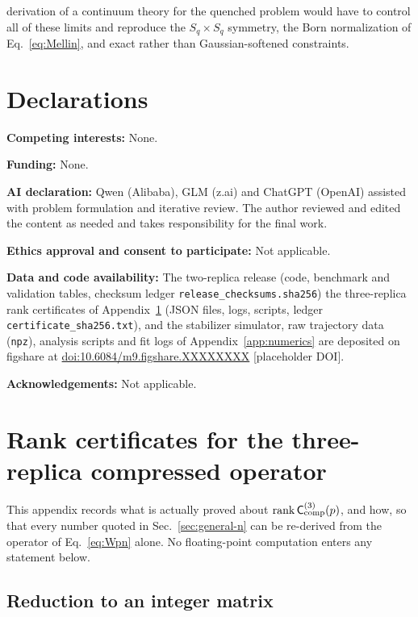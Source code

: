\documentclass[aps,prx,reprint,superscriptaddress,nobibnotes,longbibliography]{revtex4-2}
\theoremstyle{remark}
\newcommand{\rk}{\operatorname{rank}}
\newcommand{\Ccomp}{\mathsf C_{\rm comp}}
\begin{document}
derivation of a continuum theory for the quenched problem would have to control all of these limits and reproduce the $S_q\times S_q$ symmetry, the Born normalization of Eq.~\eqref{eq:Mellin}, and exact rather than Gaussian-softened constraints.


\section*{Declarations}

\noindent\textbf{Competing interests:} None.

\noindent\textbf{Funding:} None.

\noindent\textbf{AI declaration:} Qwen (Alibaba), GLM (z.ai) and ChatGPT (OpenAI) assisted with problem formulation and iterative review.  The author reviewed and edited the content as needed and takes responsibility for the final work.

\noindent\textbf{Ethics approval and consent to participate:} Not applicable.

\noindent\textbf{Data and code availability:} The two-replica release (code, benchmark and validation tables, checksum ledger \texttt{release\_checksums.sha256}) the three-replica rank certificates of Appendix~\ref{app:rank3} (JSON files, logs, scripts, ledger \texttt{certificate\_sha256.txt}), and the stabilizer simulator, raw trajectory data (\texttt{npz}), analysis scripts and fit logs of Appendix~\ref{app:numerics} are deposited on figshare at \href{https://doi.org/10.6084/m9.figshare.XXXXXXXX}{doi:10.6084/m9.figshare.XXXXXXXX} [placeholder DOI].

\noindent\textbf{Acknowledgements:} Not applicable.

\appendix
\section{Rank certificates for the three-replica compressed operator}
\label{app:rank3}

This appendix records what is actually proved about $\rk\Ccomp^{(3)}(p)$, and how, so that every number quoted in Sec.~\ref{sec:general-n} can be re-derived from the operator of Eq.~\eqref{eq:Wpn} alone.  No floating-point computation enters any statement below.

\subsection{Reduction to an integer matrix}
\label{app:reduction}
\end{document}
